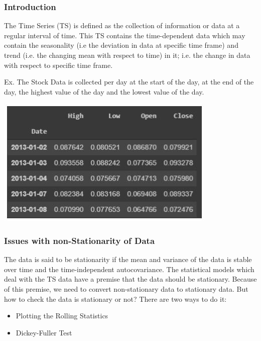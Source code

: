 	\subsubsection{Introduction}
		The Time Series (TS) is defined as the collection of information or data at a regular interval of time. This TS contains the time-dependent data which may contain the seasonality (i.e the deviation in data at specific time frame) and trend (i.e. the changing mean with respect to time) in it; i.e. the change in data with respect to specific time frame.

		Ex. The Stock Data is collected per day at the start of the day, at the end of the day, the highest value of the day and the lowest value of the day.

		\begin{center}
		\includegraphics[width=\linewidth]{figures/Ex_of_Time_Series_data_of_a_stock.jpg}	
		\label{fig: Ex of Time Series data of a stock}
		\end{center}


	
	\subsubsection{Issues with non-Stationarity of Data}
	
		The data is said to be stationarity if the mean and variance of the data is stable over time and the time-independent autocovariance. The statistical models which deal with the TS data have a premise that the data should be stationary. Because of this premise, we need to convert non-stationary data to stationary data. But how to check the data is stationary or not? There are two ways to do it:
		\begin{itemize}
		
			\item Plotting the Rolling Statistics
			
			\item Dickey-Fuller Test

		\end{itemize}
		
